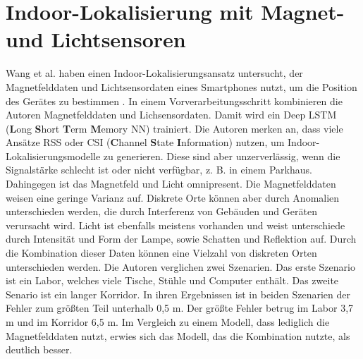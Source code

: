 \section{Indoor-Lokalisierung mit Magnet- und Lichtsensoren}
Wang et al. haben einen Indoor-Lokalisierungsansatz untersucht, der Magnetfelddaten und
Lichtsensordaten eines Smartphones nutzt, um die Position des Gerätes zu bestimmen \cite{wang2018deepml}.
In einem Vorverarbeitungsschritt kombinieren die Autoren Magnetfelddaten und Lichsensordaten.
Damit wird ein Deep LSTM (\textbf{L}ong  \textbf{S}hort \textbf{T}erm \textbf{M}emory NN) trainiert.
\newline
\newline
Die Autoren merken an, dass viele Ansätze RSS oder CSI (\textbf{C}hannel \textbf{S}tate \textbf{I}nformation) nutzen, um Indoor-Lokalisierungsmodelle zu generieren.
Diese sind aber unzerverlässig, wenn die Signalstärke schlecht ist oder nicht verfügbar, z. B. in einem Parkhaus.
Dahingegen ist das Magnetfeld und Licht omnipresent.
Die Magnetfelddaten weisen eine geringe Varianz auf.
\newpage
Diskrete Orte können aber durch Anomalien unterschieden werden, die durch Interferenz von Gebäuden und Geräten verursacht wird.
Licht ist ebenfalls meistens vorhanden und weist unterschiede durch Intensität und Form der Lampe, sowie Schatten und Reflektion auf.
Durch die Kombination dieser Daten können eine Vielzahl von diskreten Orten unterschieden werden.
\newline
\newline
Die Autoren verglichen zwei Szenarien.
Das erste Szenario ist ein Labor, welches viele Tische, Stühle und Computer enthält.
Das zweite Senario ist ein langer Korridor.
In ihren Ergebnissen ist in beiden Szenarien der Fehler zum größten Teil unterhalb 0,5 m.
Der größte Fehler betrug im Labor 3,7 m und im Korridor 6,5 m.
Im Vergleich zu einem Modell, dass lediglich die Magnetfelddaten nutzt, erwies sich das Modell, das die Kombination nutzte, als deutlich besser.